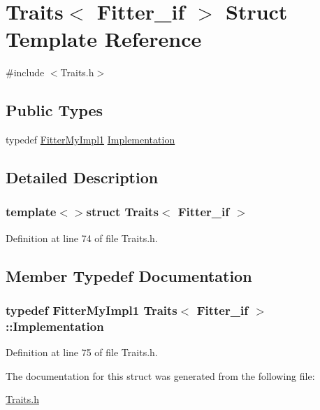 \hypertarget{struct_traits_3_01_fitter__if_01_4}{\section{Traits$<$ Fitter\-\_\-if $>$ Struct Template Reference}
\label{struct_traits_3_01_fitter__if_01_4}
}


{\ttfamily \#include $<$Traits.\-h$>$}

\subsection*{Public Types}
\begin{DoxyCompactItemize}
\item 
typedef \hyperlink{class_fitter_my_impl1}{Fitter\-My\-Impl1} \hyperlink{struct_traits_3_01_fitter__if_01_4_ae583860c62ded7016b4d038d17b9b480}{Implementation}
\end{DoxyCompactItemize}


\subsection{Detailed Description}
\subsubsection*{template$<$$>$struct Traits$<$ Fitter\-\_\-if $>$}



Definition at line 74 of file Traits.\-h.



\subsection{Member Typedef Documentation}
\hypertarget{struct_traits_3_01_fitter__if_01_4_ae583860c62ded7016b4d038d17b9b480}{
\subsubsection[{Implementation}]{\setlength{\rightskip}{0pt plus 5cm}typedef {\bf Fitter\-My\-Impl1} {\bf Traits}$<$ {\bf Fitter\-\_\-if} $>$\-::{\bf Implementation}}}\label{struct_traits_3_01_fitter__if_01_4_ae583860c62ded7016b4d038d17b9b480}


Definition at line 75 of file Traits.\-h.



The documentation for this struct was generated from the following file\-:\begin{DoxyCompactItemize}
\item 
\hyperlink{_traits_8h}{Traits.\-h}\end{DoxyCompactItemize}
